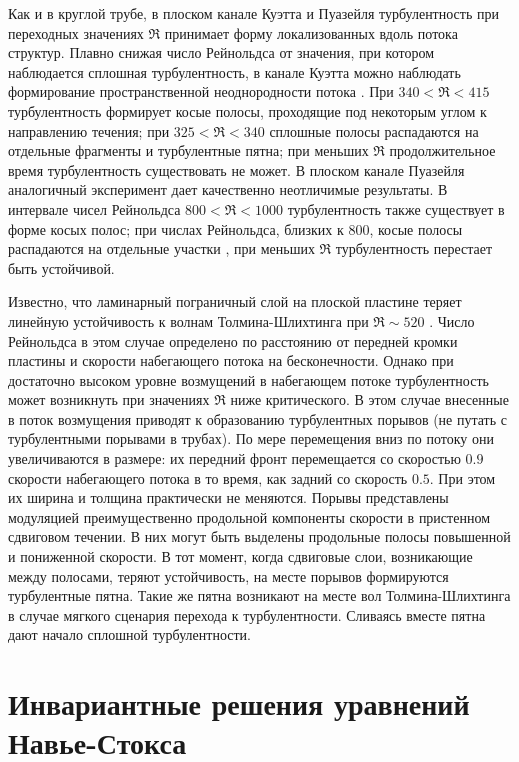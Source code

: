 Как и в круглой трубе, в плоском канале Куэтта \cite{Prigent2002, Barkley2005} и Пуазейля турбулентность при переходных значениях $\Re$ принимает форму локализованных вдоль потока структур. Плавно снижая число Рейнольдса от значения, при котором наблюдается сплошная турбулентность, в канале Куэтта можно наблюдать формирование пространственной неоднородности потока \cite{Duguet2010Couette}. При $340 < \Re < 415$ турбулентность формирует косые полосы, проходящие под некоторым углом к направлению течения; при $325 < \Re < 340$ сплошные полосы распадаются на отдельные фрагменты и турбулентные пятна; при меньших $\Re$ продолжительное время турбулентность существовать не может. В плоском канале Пуазейля аналогичный эксперимент дает качественно неотличимые результаты. В интервале чисел Рейнольдса $800 < \Re < 1000$ турбулентность также существует в форме косых полос; при числах Рейнольдса, близких к 800, косые полосы распадаются на отдельные участки \cite{Tuckerman2014, Lernoult2014, Sano2015}, при меньших $\Re$ турбулентность перестает быть устойчивой. 

Известно, что ламинарный пограничный слой на плоской пластине теряет линейную устойчивость к волнам Толмина-Шлихтинга при $\Re \sim 520$ \cite{Schlichting2004}. Число Рейнольдса в этом случае определено по расстоянию от передней кромки пластины и скорости набегающего потока на бесконечности. Однако при достаточно высоком уровне возмущений в набегающем потоке турбулентность может возникнуть при значениях $\Re$ ниже критического. В этом случае внесенные в поток возмущения приводят к образованию турбулентных порывов \cite{Katasonov2014} (не путать с турбулентными порывами в трубах). По мере перемещения вниз по потоку они увеличиваются в размере: их передний фронт перемещается со скоростью $0.9$ скорости набегающего потока в то время, как задний со скорость $0.5$. При этом их ширина и толщина практически не меняются. Порывы представлены модуляцией преимущественно продольной компоненты скорости в пристенном сдвиговом течении. В них могут быть выделены продольные полосы повышенной и пониженной скорости. В тот момент, когда сдвиговые слои, возникающие между полосами, теряют устойчивость, на месте порывов формируются турбулентные пятна. Такие же пятна возникают на месте вол Толмина-Шлихтинга в случае мягкого сценария перехода к турбулентности. Сливаясь вместе пятна дают начало сплошной турбулентности. 


\section{Инвариантные решения уравнений Навье-Стокса}



